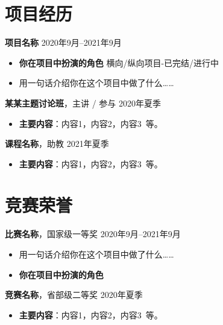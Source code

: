 \documentclass[11pt]{article}
\newlength{\iconwidth}
\begin{document}
    \begin{minipage}[t]{\textwidth}
    \section[项目经历]{\quad 项目经历}
    
    {\large \textbf{项目名称}} \hfill 2020年9月--2021年9月
    \begin{itemize}
        \item \textbf{你在项目中扮演的角色} \hfill 横向/纵向项目-已完结/进行中
        \item 用一句话介绍你在这个项目中做了什么\dots\dots
    \end{itemize}

    \vspace{0.5em}
    {\large \textbf{某某主题讨论班}}，主讲 / 参与 \hfill 2020年夏季
    \begin{itemize}
        \item \textbf{主要内容}：内容1，内容2，内容3\ 等。
    \end{itemize}

    \vspace{0.5em}
    {\large \textbf{课程名称}}，助教 \hfill 2021年夏季
    \begin{itemize}
        \item \textbf{主要内容}：内容1，内容2，内容3\ 等。
    \end{itemize}
    
    \vspace{1.2em}
    \end{minipage}

    \begin{minipage}[t]{\textwidth}

    \section[竞赛荣誉]{\quad 竞赛荣誉}

    {\large \textbf{比赛名称}}，国家级一等奖 \hfill 2020年9月--2021年9月
    \begin{itemize}
        \item 用一句话介绍你在这个项目中做了什么\dots\dots
        \item \textbf{你在项目中扮演的角色}
    \end{itemize}

    \vspace{0.5em}
    {\large \textbf{竞赛名称}}，省部级二等奖 \hfill 2020年夏季
    \begin{itemize}
        \item \textbf{主要内容}：内容1，内容2，内容3\ 等。
    \end{itemize}

    \vspace{1.2em}
    \end{minipage}
    
\end{document}
